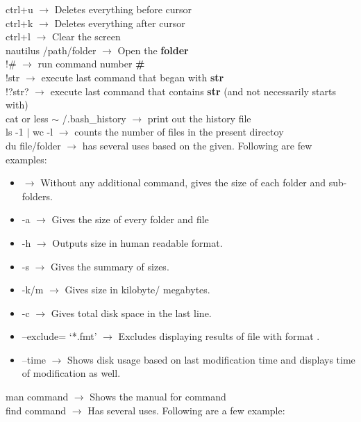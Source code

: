 \documentclass[twoside,a4paper]{article}
\newcommand{\tcb}{\color{blue}}
\newcommand{\tcr}{\color{red}}
\newcommand{\tck}{\color{black}}
\newcommand{\ra }{$\rightarrow$ }
\newcommand{\hs}{\hspace}
\begin{document}
\begin{multicols}{2}
	\hs{-0.5 cm}\tcr  ctrl+u \tck  \ra Deletes
	everything before cursor\\
	\tcr  ctrl+k \tck  \ra Deletes everything after
	cursor\\
	\tcr  ctrl+l \tck  \ra Clear the screen\\
	\tcr   nautilus \tcb  /path/folder \tck  \ra Open
	the \textbf{folder}\\
	\tcr !\tcb \# \tck \ra run command 
	number \textbf{\#}\\
	\tcr !\tcb str \tck \ra execute last 
	command that began with \textbf{str}\\
	\tcr !\tcb ?str? \tck \ra execute last
	command that contains \textbf{str} (and not necessarily starts with)\\
	\tcr cat or less \tcb $\sim$ /.bash\_history \tck 
	\ra print out the history file\\
	\tcr ls -1 $\mid$ wc -l \tck 
	\ra counts the number of files in the present directoy\\
	\tcr du \tcb {-command} \color{magenta} file/folder \tck 
	\ra has several uses based on the \tcb {command} 
	\tck given. Following are few examples:\\
	\begin{itemize}
		\item \tck \ra Without any additional command, gives
		the size of each folder and sub-folders.
		\item \tcb  -a \tck \ra Gives the size of every
		folder and file
		\item \tcb  -h \tck \ra Outputs size in human
		readable format.
		\item \tcb  -s \tck \ra Gives the summary of sizes.
		\item \tcb  -k/m \tck \ra Gives size in kilobyte/
		megabytes.
		\item \tcb  -c \tck \ra Gives total disk space
		in the last line.
		\item \tcb  --exclude= \color{magenta}`*.fmt' \tck $\rightarrow$
		Excludes displaying results of file with format \color{magenta}{fmt} \tck .
		\item \tcb  --time \tck \ra Shows disk usage based 
		on last modification time and displays time of modification as well.
	\end{itemize}
	\tcr man \tcb  command \tck \ra Shows the
	manual for \tcr  \tcb  command\\
	\tcr  find \tcb  command \tck \ra Has
	several uses. Following are a few example:\\
	\tck 
	\begin{itemize}

\end{itemize}
\end{multicols}
\end{document}
